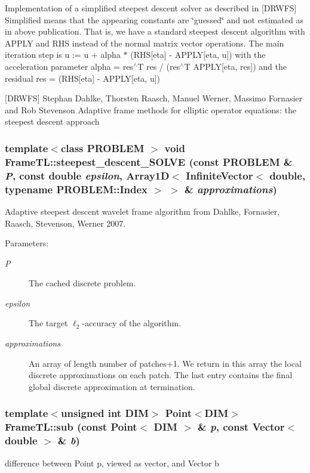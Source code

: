 Implementation of a simplified steepest descent solver as described in \mbox{[}DRWFS\mbox{]} Simplified means that the appearing constants are \char`\"{}guessed\char`\"{} and not estimated as in above publication. That is, we have a standard steepest descent algorithm with APPLY and RHS instead of the normal matrix vector operations. The main iteration step is u := u + alpha $\ast$ (RHS\mbox{[}eta\mbox{]} - APPLY\mbox{[}eta, u\mbox{]}) with the acceleration parameter alpha = res$^\wedge$T res / (res$^\wedge$T APPLY\mbox{[}eta, res\mbox{]}) and the residual res = (RHS\mbox{[}eta\mbox{]} - APPLY\mbox{[}eta, u\mbox{]})

\mbox{[}DRWFS\mbox{]} Stephan Dahlke, Thorsten Raasch, Manuel Werner, Massimo Fornasier and Rob Stevenson Adaptive frame methods for elliptic operator equations: the steepest descent approach \hypertarget{namespaceFrameTL_b98b858d0561768f9494ac7f962a6857}{
\subsubsection[{steepest\_\-descent\_\-SOLVE}]{\setlength{\rightskip}{0pt plus 5cm}template$<$class PROBLEM $>$ void FrameTL::steepest\_\-descent\_\-SOLVE (const PROBLEM \& {\em P}, \/  const double {\em epsilon}, \/  Array1D$<$ InfiniteVector$<$ double, typename PROBLEM::Index $>$ $>$ \& {\em approximations})}}
\label{namespaceFrameTL_b98b858d0561768f9494ac7f962a6857}


Adaptive steepest descent wavelet frame algorithm from Dahlke, Fornasier, Raasch, Stevenson, Werner 2007. 

\begin{Desc}
\item[Parameters:]
\begin{description}
\item[{\em P}]The cached discrete problem. \item[{\em epsilon}]The target $\ell_2$-accuracy of the algorithm. \item[{\em approximations}]An array of length number of patches+1. We return in this array the local discrete approximations on each patch. The last entry contains the final global discrete approximation at termination. \end{description}
\end{Desc}
\hypertarget{namespaceFrameTL_ab03f9658bfef63434301affb3b5803a}{
\subsubsection[{sub}]{\setlength{\rightskip}{0pt plus 5cm}template$<$unsigned int DIM$>$ Point$<$DIM$>$ FrameTL::sub (const Point$<$ DIM $>$ \& {\em p}, \/  const Vector$<$ double $>$ \& {\em b})}}
\label{namespaceFrameTL_ab03f9658bfef63434301affb3b5803a}


difference between Point p, viewed as vector, and Vector b 